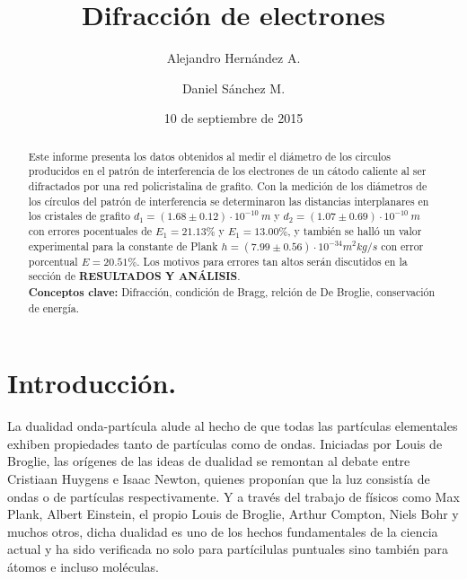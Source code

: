 \documentclass[prb,aps,twocolumn,preprintnumbers,amsmath,amssymb]{revtex4}
\begin{document}
\title{Difracción de electrones}%

\author{Alejandro Hernández A.}%
\author{Daniel Sánchez M.}%
%

\date{10 de septiembre de 2015}%

\begin{abstract}
Este informe presenta los datos obtenidos al medir el diámetro de los circulos producidos en el patrón de interferencia de los electrones de un cátodo caliente al ser difractados por una red policristalina de grafito. Con la medición de los diámetros de los círculos del patrón de interferencia se determinaron las distancias interplanares en los cristales de grafito $d_{1} = (1.68 \pm 0.12) \cdot 10^{-10}\ m$ y $d_{2} = (1.07 \pm 0.69) \cdot 10^{-10}\ m$ con errores pocentuales de $E_{1} = 21.13\%$ y $E_{1}= 13.00\%$, y también se halló un valor experimental para la constante de Plank $h = (7.99 \pm 0.56) \cdot 10^{-34} m^2kg/s$ con error porcentual $E = 20.51\%$. Los motivos para errores tan altos serán discutidos en la sección de \textbf{RESULTADOS Y ANÁLISIS}.\\

\noindent \textbf{Conceptos clave:} Difracción, condición de Bragg, relción de De Broglie, conservación de energía.
\end{abstract}
                             
\maketitle

\section{Introducción.}

La dualidad onda-partícula alude al hecho de que todas las partículas elementales exhiben propiedades tanto de partículas como de ondas. Iniciadas por Louis de Broglie, las orígenes de las ideas de dualidad se remontan al debate entre Cristiaan Huygens e Isaac Newton, quienes proponían que la luz consistía de ondas o de partículas respectivamente. Y a través del trabajo de físicos como Max Plank, Albert Einstein, el propio Louis de Broglie, Arthur Compton, Niels Bohr y muchos otros, dicha dualidad es uno de los hechos fundamentales de la ciencia actual y ha sido verificada no solo para partícilulas puntuales sino también para átomos e incluso moléculas.\\
\end{document}
